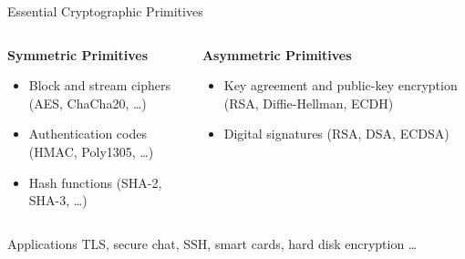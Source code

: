 \documentclass[xcolor=table,10pt,aspectratio=169]{beamer}
\begin{document}
\begin{frame}[label={sec:org64eb2c2}]{Essential Cryptographic Primitives}
\begin{columns}[t]
\begin{column}{0.5\columnwidth}
\textbf{Symmetric Primitives}

\small

\begin{itemize}
\item Block and stream ciphers (AES, ChaCha20, \ldots)
\item Authentication codes (HMAC, Poly1305, \ldots)
\item Hash functions (SHA-2, SHA-3, \ldots)
\end{itemize}
\end{column}

\begin{column}{0.5\columnwidth}
\textbf{Asymmetric Primitives}

\small

\begin{itemize}
\item Key agreement and public-key encryption (RSA, Diffie-Hellman, ECDH)
\item Digital signatures (RSA, DSA, ECDSA)
\end{itemize}
\end{column}
\end{columns}

\begin{block}{Applications}
TLS, secure chat, SSH, smart cards, hard disk encryption …
\end{block}
\end{frame}
\end{document}
